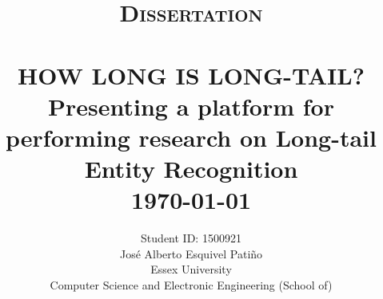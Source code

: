 \title{ \normalsize \textsc{Dissertation}
		\\ [2.0cm]
		\HRule{0.5pt} \\
		\LARGE \textbf{\uppercase{How long is long-tail?}} \\ 
		Presenting a platform for performing research on Long-tail Entity Recognition 
		\HRule{2pt} \\ [0.5cm]
        \normalsize \today \vspace*{5\baselineskip}}
\date{}

\author{
		Student ID: 1500921 \\ 
        José Alberto Esquivel Patiño \\
		Essex University \\
		Computer Science and Electronic Engineering (School of)}


\maketitle

\newpage

\tableofcontents

